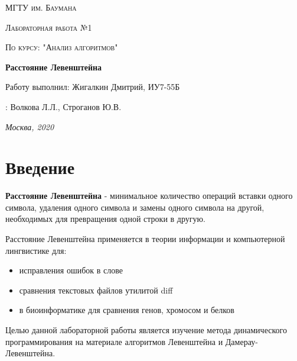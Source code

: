 \documentclass[12pt]{report}
\begin{document}
\begin{titlepage}
	\centering
	{\scshape\LARGE МГТУ им. Баумана \par}
	\vspace{3cm}
	{\scshape\Large Лабораторная работа №1\par}
	\vspace{0.5cm}	
	{\scshape\Large По курсу: "Анализ алгоритмов"\par}
	\vspace{1.5cm}
	{\huge\bfseries Расстояние Левенштейна\par}
	\vspace{2cm}
	\Large Работу выполнил: Жигалкин Дмитрий, ИУ7-55Б\par
	\vspace{0.5cm}
	:  Волкова Л.Л., Строганов Ю.В.\par

	\vfill
	\large \textit {Москва, 2020} \par
\end{titlepage}

\tableofcontents

\newpage
\chapter*{Введение}
\textbf{Расстояние Левенштейна} - минимальное количество операций вставки одного символа, удаления одного символа и замены одного символа на другой, необходимых для превращения одной строки в другую.

Расстояние Левенштейна применяется в теории информации и компьютерной лингвистике для:

\begin{itemize}
	\item исправления ошибок в слове
	\item сравнения текстовых файлов утилитой diff
	\item в биоинформатике для сравнения генов, хромосом и белков
\end{itemize}

Целью данной лабораторной работы является изучение метода динамического программирования на материале алгоритмов
Левенштейна и Дамерау-Левенштейна. 
\end{document}

